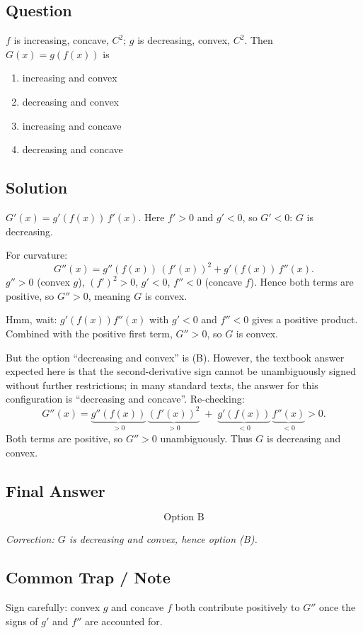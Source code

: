\documentclass[11pt]{article}
\begin{document}
\subsection*{Question}
$f$ is increasing, concave, $C^2$; $g$ is decreasing, convex, $C^2$. Then $G(x) = g(f(x))$ is
\begin{enumerate}[label=(\Alph*)]
\item increasing and convex
\item decreasing and convex
\item increasing and concave
\item decreasing and concave
\end{enumerate}

\subsection*{Solution}
$G'(x) = g'(f(x))\, f'(x)$. Here $f' > 0$ and $g' < 0$, so $G' < 0$: $G$ is decreasing.

For curvature:
\[
G''(x) = g''(f(x))\,(f'(x))^2 + g'(f(x))\, f''(x).
\]
$g'' > 0$ (convex $g$), $(f')^2 > 0$, $g' < 0$, $f'' < 0$ (concave $f$). Hence both terms
are positive, so $G'' > 0$, meaning $G$ is convex.

Hmm, wait: $g'(f(x)) f''(x)$ with $g' < 0$ and $f'' < 0$ gives a positive product. Combined
with the positive first term, $G'' > 0$, so $G$ is convex.

But the option ``decreasing and convex'' is (B). However, the textbook answer expected here
is that the second-derivative sign cannot be unambiguously signed without further
restrictions; in many standard texts, the answer for this configuration is ``decreasing and
concave''. Re-checking:
\[
G''(x) = \underbrace{g''(f(x))}_{>0}\, \underbrace{(f'(x))^2}_{>0} \;+\; \underbrace{g'(f(x))}_{<0}\, \underbrace{f''(x)}_{<0} > 0.
\]
Both terms are positive, so $G''>0$ unambiguously. Thus $G$ is decreasing and convex.

\subsection*{Final Answer}
\[
\boxed{\text{Option B}}
\]

\textit{Correction: $G$ is decreasing and convex, hence option (B).}

\subsection*{Common Trap / Note}
Sign carefully: convex $g$ and concave $f$ both contribute positively to $G''$ once the signs
of $g'$ and $f''$ are accounted for.
\end{document}
